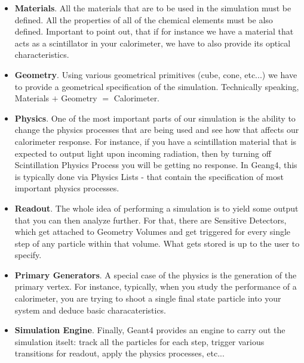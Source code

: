 \begin{itemize}
    \item \textbf{Materials}. All the materials that are to be used in the simulation must be defined. All the properties of all of the chemical elements must be also defined. Important to point out, that if for instance we have a material that acts as a scintillator in your calorimeter, we have to also provide its optical characteristics.
    \item \textbf{Geometry}. Using various geometrical primitives (cube, cone, etc...) we have to provide a geometrical specification of the simulation. Technically speaking, Materials $+$ Geometry $=$ Calorimeter.
    \item \textbf{Physics}. One of the most important parts of our simulation is the ability to change the physics processes that are being used and see how that affects our calorimeter response. For instance, if you have a scintillation material that is expected to output light upon incoming radiation, then by turning off Scintillation Physics Process you will be getting no response. In Geang4, this is typically done via Physics Lists - that contain the specification of most important physics processes.
    \item \textbf{Readout}. The whole idea of performing a simulation is to yield some output that you can then analyze further. For that, there are Sensitive Detectors, which get attached to Geometry Volumes and get triggered for every single step of any particle within that volume. What gets stored is up to the user to specify.
    \item \textbf{Primary Generators}. A special case of the physics is the generation of the primary vertex. For instance, typically, when you study the performance of a calorimeter, you are trying to shoot a single final state particle into your system and deduce basic characateristics.
    \item \textbf{Simulation Engine}. Finally, Geant4 provides an engine to carry out the simulation itselt: track all the particles for each step, trigger various transitions for readout, apply the physics processes, etc...
\end{itemize}